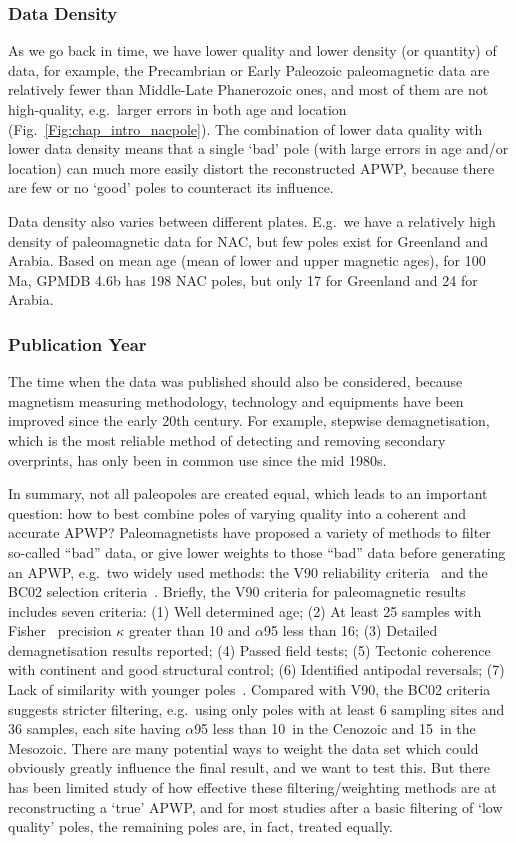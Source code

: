 \subsubsection{Data Density}

As we go back in time, we have lower quality and lower density (or quantity) of
data, for example, the Precambrian or Early Paleozoic paleomagnetic data are
relatively fewer than Middle-Late Phanerozoic ones, and most of them are not
high-quality, e.g.\ larger errors in both age and location
(Fig.~\ref{Fig:chap_intro_nacpole}). The combination of lower data quality with lower data
density means that a single `bad' pole (with large errors in age and/or
location) can much more easily distort the reconstructed APWP, because there
are few or no `good' poles to counteract its influence.

Data density also varies between different plates. E.g.\ we have a relatively
high density of paleomagnetic data for NAC, but few poles exist for Greenland
and Arabia. Based on mean age (mean of lower and upper magnetic ages), for
100 Ma, GPMDB 4.6b has 198 NAC poles, but only 17 for Greenland and
24 for Arabia.

\subsubsection{Publication Year}

The time when the data was published should also be considered, because
magnetism measuring methodology, technology and equipments have been improved
since the early 20th century. For example, stepwise demagnetisation, which is
the most reliable method of detecting and removing secondary overprints, has
only been in common use since the mid 1980s.

In summary, not all paleopoles are created equal, which leads to an
important question: how to best combine poles of varying quality into a
coherent and accurate APWP\@? Paleomagnetists have proposed a variety of methods
to filter so-called ``bad'' data, or give lower weights to those ``bad'' data
before generating an APWP, e.g.\ two widely used methods: the V90 reliability
criteria~\cite{v90} and the BC02 selection criteria~\cite{B02}. Briefly, the V90
criteria for paleomagnetic results includes seven criteria: (1) Well determined
age; (2) At least 25 samples with Fisher~\cite{F53} precision $\kappa$ greater
than 10 and $\alpha$95 less than 16\degree; (3) Detailed demagnetisation results
reported; (4) Passed field tests; (5) Tectonic coherence with continent and good
structural control; (6) Identified antipodal reversals; (7) Lack of similarity
with younger poles~\cite{T92}. Compared with V90, the BC02 criteria suggests
stricter filtering, e.g.\ using only poles with at least 6 sampling sites and 36
samples, each site having $\alpha$95 less than 10\degree\ in the Cenozoic and
15\degree\ in the Mesozoic. There are many potential ways to weight the data set
which could obviously greatly influence the final result, and we want to test
this. But there has been limited study of how effective these
filtering/weighting methods are at reconstructing a `true' APWP, and for most
studies after a basic filtering of `low quality' poles, the remaining poles are,
in fact, treated equally.

